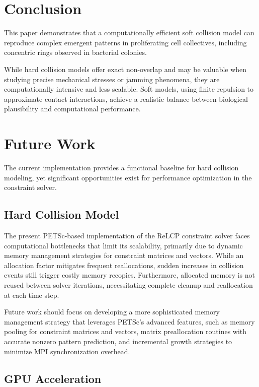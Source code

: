 \documentclass[conference]{IEEEtran}
\begin{document}
\section{Conclusion}

This paper demonstrates that a computationally efficient soft collision model can reproduce complex emergent patterns in proliferating cell collectives, including concentric rings observed in bacterial colonies.

While hard collision models offer exact non-overlap and may be valuable when studying precise mechanical stresses or jamming phenomena, they are computationally intensive and less scalable. Soft models, using finite repulsion to approximate contact interactions, achieve a realistic balance between biological plausibility and computational performance.

\newpage
\section{Future Work}

The current implementation provides a functional baseline for hard collision modeling, yet significant opportunities exist for performance optimization in the constraint solver.

\subsection{Hard Collision Model}
The present PETSc-based implementation of the ReLCP constraint solver faces computational bottlenecks that limit its scalability, primarily due to dynamic memory management strategies for constraint matrices and vectors. While an allocation factor mitigates frequent reallocations, sudden increases in collision events still trigger costly memory recopies. Furthermore, allocated memory is not reused between solver iterations, necessitating complete cleanup and reallocation at each time step.

Future work should focus on developing a more sophisticated memory management strategy that leverages PETSc's advanced features, such as memory pooling for constraint matrices and vectors, matrix preallocation routines with accurate nonzero pattern prediction, and incremental growth strategies to minimize MPI synchronization overhead.


\subsection{GPU Acceleration}
\end{document}
